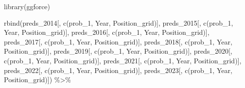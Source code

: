 \documentclass[
]{book}
\newenvironment{Shaded}{\begin{snugshade}}{\end{snugshade}}
\newcommand{\FunctionTok}[1]{\textcolor[rgb]{0.00,0.00,0.00}{#1}}
\newcommand{\NormalTok}[1]{#1}
\newcommand{\SpecialCharTok}[1]{\textcolor[rgb]{0.00,0.00,0.00}{#1}}
\newcommand{\StringTok}[1]{\textcolor[rgb]{0.31,0.60,0.02}{#1}}
\begin{document}
\begin{Shaded}
\begin{Highlighting}[]
\FunctionTok{library}\NormalTok{(ggforce)}

\FunctionTok{rbind}\NormalTok{(preds\_2014[, }\FunctionTok{c}\NormalTok{(}\StringTok{\textquotesingle{}prob\_1\textquotesingle{}}\NormalTok{, }\StringTok{\textquotesingle{}Year\textquotesingle{}}\NormalTok{, }\StringTok{\textquotesingle{}Position\_grid\textquotesingle{}}\NormalTok{)], }
\NormalTok{      preds\_2015[, }\FunctionTok{c}\NormalTok{(}\StringTok{\textquotesingle{}prob\_1\textquotesingle{}}\NormalTok{, }\StringTok{\textquotesingle{}Year\textquotesingle{}}\NormalTok{, }\StringTok{\textquotesingle{}Position\_grid\textquotesingle{}}\NormalTok{)], }
\NormalTok{      preds\_2016[, }\FunctionTok{c}\NormalTok{(}\StringTok{\textquotesingle{}prob\_1\textquotesingle{}}\NormalTok{, }\StringTok{\textquotesingle{}Year\textquotesingle{}}\NormalTok{, }\StringTok{\textquotesingle{}Position\_grid\textquotesingle{}}\NormalTok{)], preds\_2017[, }\FunctionTok{c}\NormalTok{(}\StringTok{\textquotesingle{}prob\_1\textquotesingle{}}\NormalTok{, }\StringTok{\textquotesingle{}Year\textquotesingle{}}\NormalTok{, }\StringTok{\textquotesingle{}Position\_grid\textquotesingle{}}\NormalTok{)], preds\_2018[, }\FunctionTok{c}\NormalTok{(}\StringTok{\textquotesingle{}prob\_1\textquotesingle{}}\NormalTok{, }\StringTok{\textquotesingle{}Year\textquotesingle{}}\NormalTok{, }\StringTok{\textquotesingle{}Position\_grid\textquotesingle{}}\NormalTok{)],}
\NormalTok{      preds\_2019[, }\FunctionTok{c}\NormalTok{(}\StringTok{\textquotesingle{}prob\_1\textquotesingle{}}\NormalTok{, }\StringTok{\textquotesingle{}Year\textquotesingle{}}\NormalTok{, }\StringTok{\textquotesingle{}Position\_grid\textquotesingle{}}\NormalTok{)],}
\NormalTok{      preds\_2020[, }\FunctionTok{c}\NormalTok{(}\StringTok{\textquotesingle{}prob\_1\textquotesingle{}}\NormalTok{, }\StringTok{\textquotesingle{}Year\textquotesingle{}}\NormalTok{, }\StringTok{\textquotesingle{}Position\_grid\textquotesingle{}}\NormalTok{)], preds\_2021[, }\FunctionTok{c}\NormalTok{(}\StringTok{\textquotesingle{}prob\_1\textquotesingle{}}\NormalTok{, }\StringTok{\textquotesingle{}Year\textquotesingle{}}\NormalTok{, }\StringTok{\textquotesingle{}Position\_grid\textquotesingle{}}\NormalTok{)], }
\NormalTok{      preds\_2022[, }\FunctionTok{c}\NormalTok{(}\StringTok{\textquotesingle{}prob\_1\textquotesingle{}}\NormalTok{, }\StringTok{\textquotesingle{}Year\textquotesingle{}}\NormalTok{, }\StringTok{\textquotesingle{}Position\_grid\textquotesingle{}}\NormalTok{)], preds\_2023[, }\FunctionTok{c}\NormalTok{(}\StringTok{\textquotesingle{}prob\_1\textquotesingle{}}\NormalTok{, }\StringTok{\textquotesingle{}Year\textquotesingle{}}\NormalTok{, }\StringTok{\textquotesingle{}Position\_grid\textquotesingle{}}\NormalTok{)]) }\SpecialCharTok{\%\textgreater{}\%} 

\end{Highlighting}
\end{Shaded}
\end{document}
